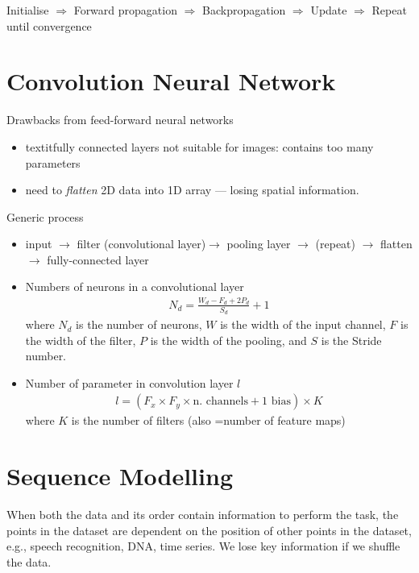 \documentclass[a4paper,10pt]{article}
\begin{document}
Initialise $\Rightarrow$ Forward propagation $\Rightarrow$ Backpropagation $\Rightarrow$ Update $\Rightarrow$ Repeat until convergence



\section{Convolution Neural Network}
Drawbacks from feed-forward neural networks 
\begin{itemize}
    \item textit{fully connected} layers not suitable for images: contains too many parameters  
    \item need to \textit{flatten} 2D data into 1D array --- losing spatial information. 
\end{itemize}

Generic process
\begin{itemize}
    \item input $\rightarrow$ filter (convolutional layer)$\rightarrow$ pooling layer $\rightarrow$ (repeat) $\rightarrow$ flatten $\rightarrow$ fully-connected layer
    \item Numbers of neurons in a convolutional layer
        \begin{gather*}
            N_d = \frac{W_d-F_d+2P_d}{S_d}+1
        \end{gather*}
    where $N_d$ is the number of neurons, $W$ is the width of the input channel, $F$ is the width of the filter, $P$ is the width of the pooling, and $S$ is the Stride number. 
    \item Number of parameter in convolution layer $l$
        \begin{gather*}
            l = (F_x\times F_y\times \text{n. channels} + 1 \text{ bias})\times K
        \end{gather*}
    where $K$ is the number of filters (also =number of feature maps)
\end{itemize}

\section{Sequence Modelling}
When both the data and its order contain information to perform the task, the points in the dataset are dependent on the position of other points in the dataset, e.g., speech recognition, DNA, time series. We lose key information if we shuffle the data.
\end{document}
